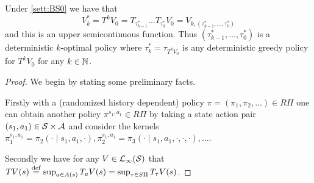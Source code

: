 \begin{prop}
  Under \cref{sett:BS0} we have that
  \[ V^*_k = T^k V_0 = T_{\tau^*_{k-1}} \dots T_{\tau^*_0} V_0
  = V_{k, (\tau^*_{k-1}, \dots, \tau^*_0)} \]
  and this is an upper semicontinuous function.
  Thus $(\tau^*_{k-1}, \dots, \tau^*_0)$ is a deterministic
  $k$-optimal policy
  where $\tau_k^* = \tau_{T^k V_0}$ is any deterministic
  greedy policy for $T^k V_0$ for any $k \in \mathbb{N}$.
  \label{prop:kOpt}
\end{prop}
\begin{proof}
  We begin by stating some preliminary facts.

  Firstly with a (randomized history dependent)
  policy $\pi = (\pi_1, \pi_2, \dots) \in R\Pi$ one can obtain another policy
  $\pi^{s_1, a_1} \in R\Pi$ by taking a state action pair
  $(s_1, a_1) \in \mathcal{S} \times \mathcal{A}$ and consider the kernels
  $\pi_1^{s_1, a_1} = \pi_2(\cdot \mid s_1, a_1, \cdot), 
  \pi_2^{s_1, a_1} = \pi_3(\cdot \mid s_1, a_1, \cdot, \cdot, \cdot),
  \dots$.

  Secondly we have for any $V \in \mathcal{L}_\infty(\mathcal{S})$ that
  $TV(s) \stackrel{\mathrm{def}}{=} \sup_{a \in A(s)} T_a V(s)
  = \sup_{\tau \in S\Pi} T_\tau V(s)$.


\end{proof}
